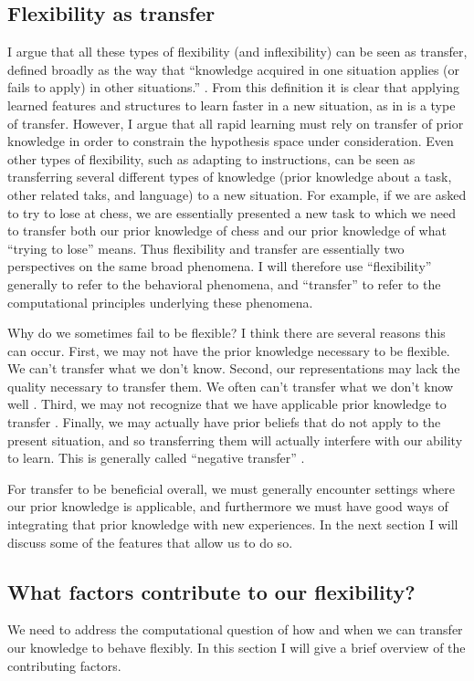\documentclass[11pt]{article}
\begin{document}
\subsection{Flexibility as transfer}
I argue that all these types of flexibility (and inflexibility) can be seen as transfer, defined broadly as the way that ``knowledge acquired in one situation applies (or fails to apply) in other situations.'' \citep{Singley1989}. From this definition it is clear that applying learned features and structures to learn faster in a new situation, as in \citet{Bourne1970} is a type of transfer. However, I argue that all rapid learning must rely on transfer of prior knowledge in order to constrain the hypothesis space under consideration. Even other types of flexibility, such as adapting to instructions, can be seen as transferring several different types of knowledge (prior knowledge about a task, other related taks, and language) to a new situation. For example, if we are asked to try to lose at chess, we are essentially presented a new task to which we need to transfer both our prior knowledge of chess and our prior knowledge of what ``trying to lose'' means. Thus flexibility and transfer are essentially two perspectives on the same broad phenomena. I will therefore use ``flexibility'' generally to refer to the behavioral phenomena, and ``transfer'' to refer to the computational principles underlying these phenomena. \par  
Why do we sometimes fail to be flexible? I think there are several reasons this can occur. First, we may not have the prior knowledge necessary to be flexible. We can't transfer what we don't know. Second, our representations may lack the quality necessary to transfer them. We often can't transfer what we don't know well \citep[c.f.]{Hazzan1999, Weber2001}. Third, we may not recognize that we have applicable prior knowledge to transfer \citep{Detterman1993}. Finally, we may actually have prior beliefs that do not apply to the present situation, and so transferring them will actually interfere with our ability to learn. This is generally called ``negative transfer'' \citep{Singley1989}. \par
For transfer to be beneficial overall, we must generally encounter settings where our prior knowledge is applicable, and furthermore we must have good ways of integrating that prior knowledge with new experiences. In the next section I will discuss some of the features that allow us to do so. \par

\subsection{What factors contribute to our flexibility?}
We need to address the computational question of how and when we can transfer our knowledge to behave flexibly. In this section I will give a brief overview of the contributing factors. \par 
\end{document}
